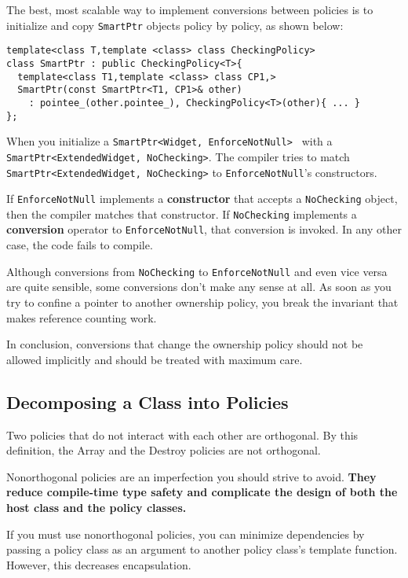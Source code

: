 The best, most scalable way to implement conversions between policies
is to initialize and copy \texttt{SmartPtr} objects policy by policy,
as shown below:

\begin{verbatim}
template<class T,template <class> class CheckingPolicy>
class SmartPtr : public CheckingPolicy<T>{
  template<class T1,template <class> class CP1,>
  SmartPtr(const SmartPtr<T1, CP1>& other)
    : pointee_(other.pointee_), CheckingPolicy<T>(other){ ... }
};
\end{verbatim}

When you initialize a \texttt{SmartPtr<Widget, EnforceNotNull> } with a
\texttt{SmartPtr<ExtendedWidget, NoChecking>}. The compiler tries to
match \texttt{SmartPtr<ExtendedWidget, NoChecking>} to
\texttt{EnforceNotNull}'s constructors.

If \texttt{EnforceNotNull}
implements a \textbf{constructor} that accepts a \texttt{NoChecking} object,
then the compiler matches that constructor. If \texttt{NoChecking}
implements a \textbf{conversion} operator to \texttt{EnforceNotNull}, that 
conversion is invoked. In any other case, the code fails to compile.

Although conversions from \texttt{NoChecking} to
\texttt{EnforceNotNull} and even vice versa are quite sensible, some
conversions don't make any sense at all.  As soon as you try to
confine a pointer to another ownership policy, you break the invariant
that makes reference counting work.

In conclusion, conversions that change the ownership policy should not
be allowed implicitly and should be treated with maximum care.

\subsection{ Decomposing a Class into Policies}

Two policies that do not interact with each other are orthogonal. By
this definition, the Array and the Destroy policies are not
orthogonal.

Nonorthogonal policies are an imperfection you should strive to
avoid. \textbf{They reduce compile-time type safety and complicate the design
  of both the host class and the policy classes.}

If you must use nonorthogonal policies, you can minimize dependencies
by passing a policy class as an argument to another policy class's
template function. However, this decreases encapsulation.
